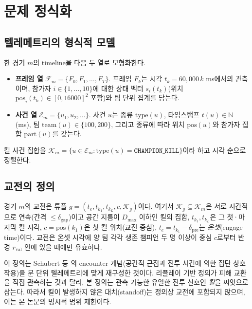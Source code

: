 \chapter{문제 정식화}
\label{ch:problem}

\section{텔레메트리의 형식적 모델}
\label{sec:problem-telemetry}

한 경기 $m$의 timeline을 다음 두 열로 모형화한다.

\begin{itemize}[leftmargin=1.5em]
  \item \textbf{프레임 열} $\mathcal{F}_m = \{F_0, F_1, \dots, F_{T}\}$. 프레임 $F_k$는 시각 $t_k = 60{,}000\,k$ ms에서의 관측이며, 참가자 $i \in \{1,\dots,10\}$에 대한 상태 벡터 $s_i(t_k)$(위치 $\mathrm{pos}_i(t_k) \in [0,16000]^2$ 포함)와 팀 단위 집계를 담는다.
  \item \textbf{사건 열} $\mathcal{E}_m = \{u_1, u_2, \dots\}$. 사건 $u$는 종류 $\mathrm{type}(u)$, 타임스탬프 $t(u) \in \mathbb{N}$ (ms), 팀 $\mathrm{team}(u) \in \{100, 200\}$, 그리고 종류에 따라 위치 $\mathrm{pos}(u)$와 참가자 집합 $\mathrm{part}(u)$를 갖는다.
\end{itemize}

킬 사건 집합을 $\mathcal{K}_m = \{u \in \mathcal{E}_m : \mathrm{type}(u) = \texttt{CHAMPION\_KILL}\}$이라 하고 시각 순으로 정렬한다.

\section{교전의 정의}
\label{sec:problem-engagement}

\begin{definition}[킬 조건부 교전]
\label{def:engagement}
경기 $m$의 교전은 튜플 $g = (t_e, t_{k_1}, t_{k_L}, c, \mathcal{K}_g)$이다. 여기서 $\mathcal{K}_g \subseteq \mathcal{K}_m$은 서로 시간적으로 연속(간격 $\le \delta_{\mathrm{gap}}$)이고 공간 지름이 $D_{\max}$ 이하인 킬의 집합, $t_{k_1}, t_{k_L}$은 그 첫·마지막 킬 시각, $c = \mathrm{pos}(k_1)$은 첫 킬 위치(교전 중심), $t_e = t_{k_1} - \delta_{\mathrm{pre}}$는 \emph{온셋}(engage time)이다. 교전은 온셋 시각에 양 팀 각각 생존 챔피언 두 명 이상이 중심 $c$로부터 반경 $r_{\mathrm{val}}$ 안에 있을 때에만 유효하다.
\end{definition}

이 정의는 Schubert 등 \cite{schubert2016esports}의 encounter 개념(공간적 근접과 전투 사건에 의한 집단 상호작용)을 분 단위 텔레메트리에 맞게 재구성한 것이다. 리플레이 기반 정의가 피해 교환을 직접 관측하는 것과 달리, 본 정의는 관측 가능한 유일한 전투 신호인 \emph{킬}을 씨앗으로 삼는다. 따라서 킬이 발생하지 않은 대치(standoff)는 정의상 교전에 포함되지 않으며, 이는 본 논문의 명시적 범위 제한이다.

